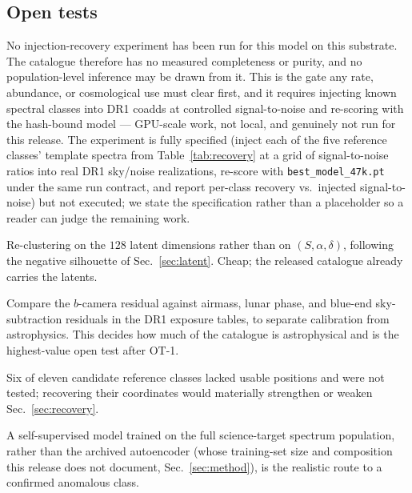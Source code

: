 \documentclass[aps,prd,twocolumn,superscriptaddress,nofootinbib,longbibliography,floatfix]{revtex4-2}
\begin{document}
\subsection{Open tests}
\label{sec:opentests}
\begin{description}[leftmargin=0em,itemsep=2pt]
  \item[OT-1 Selection function] No injection-recovery experiment has been
    run for this model on this substrate. The catalogue therefore has no
    measured completeness or purity, and no population-level inference may be
    drawn from it. This is the gate any rate, abundance, or cosmological use
    must clear first, and it requires injecting known spectral classes into
    DR1 coadds at controlled signal-to-noise and re-scoring with the
    hash-bound model --- GPU-scale work, not local, and genuinely not run for
    this release. The experiment is fully specified (inject each of the five
    reference classes' template spectra from Table~\ref{tab:recovery} at a
    grid of signal-to-noise ratios into real DR1 sky/noise realizations,
    re-score with \texttt{best\_model\_47k.pt} under the same run contract,
    and report per-class recovery vs.\ injected signal-to-noise) but not
    executed; we state the specification rather than a placeholder so a
    reader can judge the remaining work.
  \item[OT-2 Latent-space taxonomy] Re-clustering on the $128$ latent
    dimensions rather than on $(S, \alpha, \delta)$, following the negative
    silhouette of Sec.~\ref{sec:latent}. Cheap; the released catalogue
    already carries the latents.
  \item[OT-3 Blue-arm diagnosis] Compare the $b$-camera residual against
    airmass, lunar phase, and blue-end sky-subtraction residuals in the DR1
    exposure tables, to separate calibration from astrophysics. This decides
    how much of the catalogue is astrophysical and is the highest-value open
    test after OT-1.
  \item[OT-4 Wider recovery benchmark] Six of eleven candidate reference
    classes lacked usable positions and were not tested; recovering their
    coordinates would materially strengthen or weaken
    Sec.~\ref{sec:recovery}.
  \item[OT-5 Deeper scan] A self-supervised model trained on the full
    science-target spectrum population, rather than the archived autoencoder
    (whose training-set size and composition this release does not
    document, Sec.~\ref{sec:method}), is the realistic route to a confirmed
    anomalous class.
\end{description}
\end{document}
